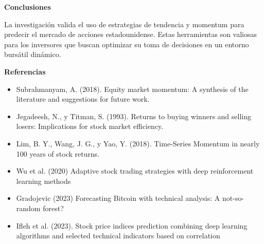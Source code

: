 \documentclass[a0,portrait]{a0poster}
\newcommand{\customsection}[1]{
    \begin{center}
        \begin{tcolorbox}[colframe=miRojo!50, colback=miRojo, width=\linewidth, boxrule=1mm, arc=3mm, auto outer arc]
            \begin{center}
            \vspace{.5cm} %
            \color{white}
            \textbf{\Huge #1}
            \color{miRojo}
            \vspace{.5cm} %
            \end{center}
        \end{tcolorbox}
    \end{center}
}
\begin{document}
\begin{multicols}{2}
\begin{minipage}{\linewidth}
    \end{minipage}
    \customsection{Conclusiones}
    \par
    \indent La investigación valida el uso de estrategias de tendencia y momentum para predecir el mercado de acciones estadounidense. Estas herramientas son valiosas para los inversores que buscan optimizar su toma de decisiones en un entorno bursátil dinámico. 
    \customsection{Referencias}
    \par
         \begin{itemize}
            \item Subrahmanyam, A. (2018). Equity market momentum: A synthesis of the literature and suggestions for future work.
            \item Jegadeesh, N., y Titman, S. (1993). Returns to buying winners and selling losers: Implications for stock market efficiency.
            \item Lim, B. Y., Wang, J. G., y Yao, Y. (2018). Time-Series Momentum in nearly 100 years of stock returns.            
            \item Wu et al. (2020) Adaptive stock trading strategies with deep reinforcement learning methods
            \item Gradojevic (2023) Forecasting Bitcoin with technical analysis: A not-so-random forest?
            \item Ifleh et al. (2023). Stock price indices prediction combining deep learning algorithms and selected technical indicators based on correlation
        \end{itemize}
        
    
    
    
    
\end{multicols}
\end{document}
